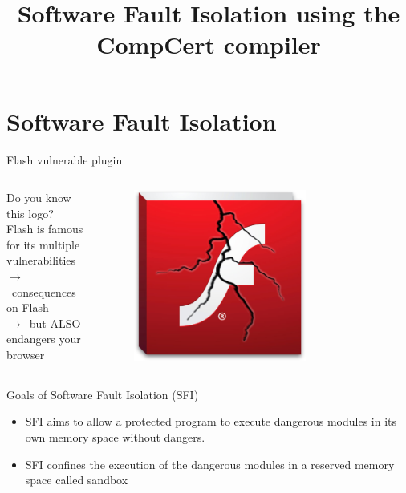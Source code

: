 \documentclass{beamer}
\title{Software Fault Isolation using the CompCert compiler}
\author[\textit{Author}:~Alexandre Dang \and \textit{Supervisor}:~Frédéric Besson]
{%
	\texorpdfstring{
		\begin{columns}[t]
			\column{.45\linewidth}
				\begin{center}
				\textit{Author}: Alexandre Dang
				\end{center}
			\column{.45\linewidth}
				\begin{center}
				\textit{Supervisor}: Frédéric Besson
				\end{center}
		\end{columns}
	}
	{\textit{Auteur}: Alexandre Dang, \textit{Superviseur}: Frédéric Besson, \textit{\'Equipe}: Celtique}
}
\institute{Team Celtique}
\begin{document}
\frame{\titlepage}
 

\section{Software Fault Isolation}
\label{sec:Software Fault Isolation}



\begin{frame}{Flash vulnerable plugin}
	\begin{columns}[onlytextwidth]
		\begin{column}{0.5\textwidth}
			Do you know this logo?\\
			\vspace{5mm}
			Flash is famous for its multiple vulnerabilities\\
			$\rightarrow$~consequences on Flash\\
			$\rightarrow$~but ALSO endangers your browser
		\end{column}
		\begin{column}{0.5\textwidth}
			\begin{figure}
				\centering
				\includegraphics[width=0.7\textwidth]{images/flash.jpg}
			\end{figure}
		\end{column}
	\end{columns}
\end{frame}


\begin{frame}{Goals of Software Fault Isolation (SFI)}
	\begin{itemize}\itemsep20pt
		\item SFI aims to allow a protected program to execute dangerous modules in its own memory space without dangers. 
		\item SFI confines the execution of the dangerous modules in a reserved memory space called sandbox
	\end{itemize}
\end{frame}
\end{document}
